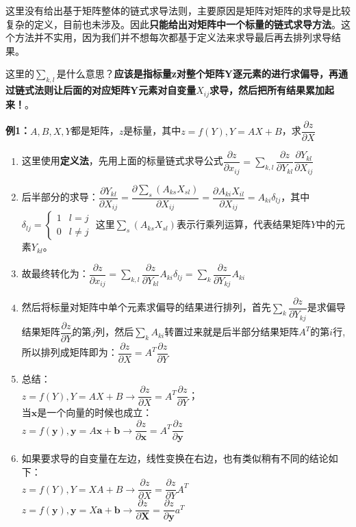     这里没有给出基于矩阵整体的链式求导法则，主要原因是矩阵对矩阵的求导是比较复杂的定义，目前也未涉及。因此\textbf{只能给出对矩阵中一个标量的链式求导方法}。这个方法并不实用，因为我们并不想每次都基于定义法来求导最后再去排列求导结果。


    这里的$\sum_{k,l}$是什么意思？\textbf{应该是指标量z对整个矩阵Y逐元素的进行求偏导，再通过链式法则让后面的对应矩阵Y元素对自变量$X_{ij}$求导，然后把所有结果累加起来！}。


    \textbf{例1：}$A,B,X,Y$都是矩阵，$z$是标量，其中$z=f(Y), Y=A X+B$，求$\dfrac{\partial z}{\partial X}$

    \begin{enumerate}
        \item 这里使用\textbf{定义法}，先用上面的标量链式求导公式$\dfrac{\partial z}{\partial x_{i j}}=\sum_{k, l} \dfrac{\partial z}{\partial Y_{k l}} \dfrac{\partial Y_{k l}}{\partial X_{i j}}$
        \item 后半部分的求导：$\dfrac{\partial Y_{k l}}{\partial X_{i j}}=\dfrac{\partial \sum_{s}\left(A_{k s} X_{s l}\right)}{\partial X_{i j}}=\dfrac{\partial A_{k i} X_{i l}}{\partial X_{i j}}=A_{k i} \delta_{l j}$，其中$\delta_{lj}=\left\{\begin{array}{ll}1 & l=j \\ 0 & l \neq j\end{array}\right.$ 这里$\sum_{s}(A_{k s} X_{s l})$表示行乘列运算，代表结果矩阵$Y$中的元素$Y_{kl}$。
        \item 故最终转化为：$\dfrac{\partial z}{\partial x_{i j}}=\sum_{k, l} \dfrac{\partial z}{\partial Y_{k l}} A_{k i} \delta_{l j}=\sum_{k} \dfrac{\partial z}{\partial Y_{k j}} A_{k i}$
        \item 然后将标量对矩阵中单个元素求偏导的结果进行排列，首先$\sum_{k} \dfrac{\partial z}{\partial Y_{k j}}$是求偏导结果矩阵$\dfrac{\partial z}{\partial Y}$的第$j$列，然后$\sum_{k} A_{ki}$转置过来就是后半部分结果矩阵$A^T$的第$i$行,所以排列成矩阵即为：$\dfrac{\partial z}{\partial X}=A^{T} \dfrac{\partial z}{\partial Y}$
        \item 总结： \\ $z=f(Y), Y=A X+B \rightarrow \dfrac{\partial z}{\partial X}=A^{T} \dfrac{\partial z}{\partial Y}$；\\ 当$\bm{x}$是一个向量的时候也成立：\\ $z=f(\mathbf{y}), \mathbf{y}=A \mathbf{x}+\mathbf{b} \rightarrow \dfrac{\partial z}{\partial \mathbf{x}}=A^{T} \dfrac{\partial z}{\partial \mathbf{y}}$
        \item 如果要求导的自变量在左边，线性变换在右边，也有类似稍有不同的结论如下：\\ $z=f(Y), Y=X A+B \rightarrow \dfrac{\partial z}{\partial X}=\dfrac{\partial z}{\partial Y} A^{T}$ \\ $z=f(\mathbf{y}), \mathbf{y}=X \mathbf{a}+\mathbf{b} \rightarrow \dfrac{\partial z}{\partial \mathbf{X}}=\dfrac{\partial z}{\partial \mathbf{y}} a^{T}$
    \end{enumerate}


